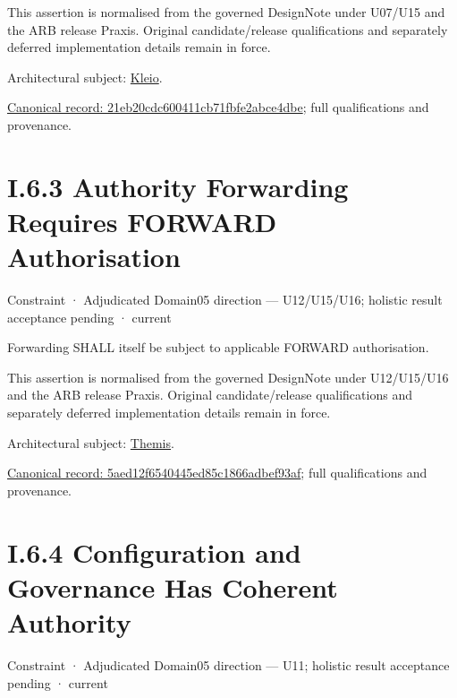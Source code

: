 This assertion is normalised from the governed DesignNote under U07/U15 and the ARB release Praxis. Original candidate/release qualifications and separately deferred implementation details remain in force.



Architectural subject: \hyperref[element:fefda110e2274884ad58906733606efd]{Kleio}.


{\footnotesize \href{../../../../continuum/motivation/constraint/21eb20cdc600411cb71fbfe2abce4dbe.md}{Canonical record: 21eb20cdc600411cb71fbfe2abce4dbe}; full qualifications and provenance.}\par
\section*{I.6.3 Authority Forwarding Requires FORWARD Authorisation}
\label{navigation:I.6.3}

\label{element:5aed12f6540445ed85c1866adbef93af}
{\small Constraint · Adjudicated Domain05 direction — U12/U15/U16; holistic result acceptance pending · current}\par

Forwarding SHALL itself be subject to applicable FORWARD authorisation.



This assertion is normalised from the governed DesignNote under U12/U15/U16 and the ARB release Praxis. Original candidate/release qualifications and separately deferred implementation details remain in force.



Architectural subject: \hyperref[element:899d34ec491948b68aad09e507dea6d1]{Themis}.


{\footnotesize \href{../../../../continuum/motivation/constraint/5aed12f6540445ed85c1866adbef93af.md}{Canonical record: 5aed12f6540445ed85c1866adbef93af}; full qualifications and provenance.}\par
\section*{I.6.4 Configuration and Governance Has Coherent Authority}
\label{navigation:I.6.4}

\label{element:7cdbc752ca2e4ebf9ee5acff84fd7400}
{\small Constraint · Adjudicated Domain05 direction — U11; holistic result acceptance pending · current}\par

